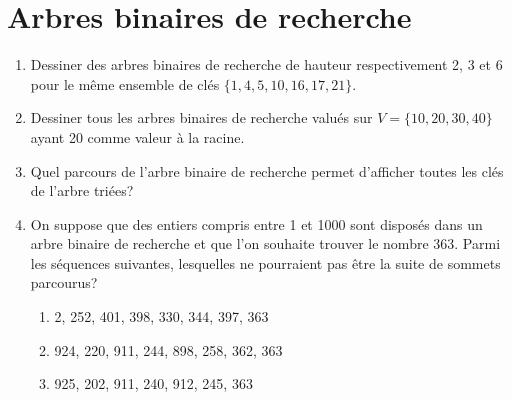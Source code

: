 \documentclass{article}[12pt]
\begin{document}
\section*{Arbres binaires de recherche}
\begin{enumerate}
\item Dessiner des arbres binaires de recherche de hauteur respectivement 2, 3 et 6 pour le même ensemble de clés $\{1,4,5,10,16,17,21\}$.
\item Dessiner tous les arbres binaires de recherche valués sur $V = \{10, 20, 30, 40\}$ ayant 20 comme valeur à la racine.
\item Quel parcours de l'arbre binaire de recherche permet d'afficher toutes les clés de l'arbre triées?
\item On suppose que des entiers compris entre 1 et 1000 sont disposés dans un arbre binaire de recherche et que l'on souhaite trouver le nombre 363. Parmi les séquences suivantes, lesquelles ne pourraient pas être la suite de sommets parcourus?
\begin{enumerate}
\item 2, 252, 401, 398, 330, 344, 397, 363
\item 924, 220, 911, 244, 898, 258, 362, 363
\item 925, 202, 911, 240, 912, 245, 363
\end{enumerate}


\end{enumerate}
\end{document}
